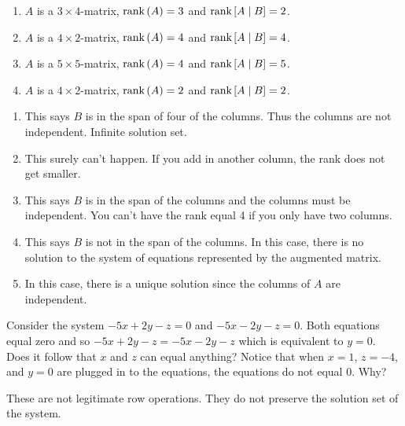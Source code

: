 \begin{enumialphparenastyle}
\begin{ex}
\begin{enumerate}
  \item $A$ is a $3\times 4$-matrix, $\mbox{\rm rank}\left(A\right) =3$ and 
    $\mbox{\rm rank}\left[A\mid B\right] =2$.
    
  \item $A$ is a $4\times 2$-matrix, $\mbox{\rm rank}\left(A\right) =4$ and 
    $\mbox{\rm rank}\left[A\mid B\right] =4$. 
    
  \item $A$ is a $5\times 5$-matrix, $\mbox{\rm rank}\left(A\right) =4$ and 
    $\mbox{\rm rank}\left[A\mid B\right] =5$. 
    
  \item $A$ is a $4\times 2$-matrix, $\mbox{\rm rank}\left(A\right) =2$ and 
    $\mbox{\rm rank}\left[A\mid B\right] =2$.
  \end{enumerate}
  
  \begin{sol}
    \begin{enumerate}
    \item This says $B$ is in the span of four of the columns. Thus the columns are not independent. Infinite solution set.
    \item This surely can't happen. If you add in another column, the rank does not get smaller.
    \item This says $B$ is in the span of the columns and the columns must be
      independent. You can't have the rank equal 4 if you only have two columns.
    \item This says $B$ is not in the span of the columns. In this case, there is no solution to the system of equations represented by the augmented matrix.
    \item In this case, there is a
      unique solution since the columns of $A$ are independent.
    \end{enumerate}
  \end{sol}
\end{ex}

\begin{ex} Consider the system $-5x+2y-z=0$ and $-5x-2y-z=0$. Both equations
equal zero and so $-5x+2y-z=-5x-2y-z$ which is equivalent to $y=0$. Does it follow that $x$
and $z$ can equal anything?  Notice that when $x=1$, $z=-4$, and $y=0$ are plugged in
to the equations, the equations do not equal $0$. Why?
\begin{sol}
These are not legitimate row
operations. They do not preserve the solution set of the system.
\end{sol}
\end{ex}

\end{enumialphparenastyle}

